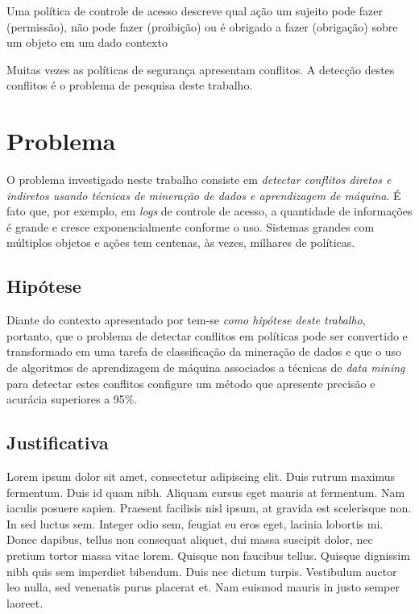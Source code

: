 Uma política de controle de acesso descreve qual  ação um sujeito pode fazer (permissão), não pode fazer (proibição) ou é obrigado a fazer (obrigação) sobre um objeto em um dado contexto\cite{sarkis2017}

Muitas vezes as políticas de segurança apresentam conflitos. A detecção destes conflitos é o problema de pesquisa deste trabalho.



\section{Problema}\label{problema}
O problema investigado neste trabalho consiste em \textit{detectar conflitos diretos e indiretos usando técnicas de mineração de dados e aprendizagem de máquina}. É fato que, por exemplo, em \textit{logs} de controle de acesso, a quantidade de informações é grande e cresce exponencialmente conforme o uso. Sistemas grandes com múltiplos objetos e ações tem centenas, às vezes, milhares de políticas.\cite{fugini_information_2004}

\subsection{Hipótese}\label{hipótese}
Diante do contexto apresentado por \cite{fugini_information_2004} tem-se \textit{como hipótese deste trabalho}, portanto, que o problema de detectar conflitos em políticas pode ser convertido e transformado em uma tarefa de classificação da mineração de dados e que o uso de algoritmos de aprendizagem de máquina associados a técnicas de \textit{data mining} para detectar estes conflitos configure um método que apresente precisão e acurácia superiores a 95\%.

\subsection{Justificativa}\label{justificativa}
Lorem ipsum dolor sit amet, consectetur adipiscing elit. Duis rutrum maximus fermentum. Duis id quam nibh. Aliquam cursus eget mauris at fermentum. Nam iaculis posuere sapien. Praesent facilisis nisl ipsum, at gravida est scelerisque non. In sed luctus sem. Integer odio sem, feugiat eu eros eget, lacinia lobortis mi. Donec dapibus, tellus non consequat aliquet, dui massa suscipit dolor, nec pretium tortor massa vitae lorem. Quisque non faucibus tellus. Quisque dignissim nibh quis sem imperdiet bibendum. Duis nec dictum turpis. Vestibulum auctor leo nulla, sed venenatis purus placerat et. Nam euismod mauris in justo semper laoreet.

